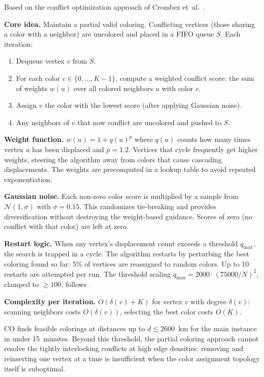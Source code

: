 \documentclass[11pt,a4paper]{article}
\begin{document}
Based on the conflict optimization approach of Crombez et~al.\ \cite{crombez2023}.

\textbf{Core idea.} Maintain a partial valid coloring. Conflicting vertices (those
sharing a color with a neighbor) are uncolored and placed in a FIFO queue $S$. Each
iteration:
\begin{enumerate}
  \item Dequeue vertex $v$ from $S$.
  \item For each color $c \in \{0, \ldots, K-1\}$, compute a weighted conflict score:
        the sum of weights $w(u)$ over all colored neighbors $u$ with color $c$.
  \item Assign $v$ the color with the lowest score (after applying Gaussian noise).
  \item Any neighbors of $v$ that now conflict are uncolored and pushed to $S$.
\end{enumerate}

\textbf{Weight function.} $w(u) = 1 + q(u)^p$ where $q(u)$ counts how many times vertex
$u$ has been displaced and $p = 1.2$. Vertices that cycle frequently get higher weights,
steering the algorithm away from colors that cause cascading displacements. The weights
are precomputed in a lookup table to avoid repeated exponentiation.

\textbf{Gaussian noise.} Each non-zero color score is multiplied by a sample from
$\mathcal{N}(1, \sigma)$ with $\sigma = 0.15$. This randomizes tie-breaking and provides
diversification without destroying the weight-based guidance. Scores of zero (no conflict
with that color) are left at zero.

\textbf{Restart logic.} When any vertex's displacement count exceeds a threshold
$q_{\max}$, the search is trapped in a cycle. The algorithm restarts by perturbing the
best coloring found so far: 5\% of vertices are reassigned to random colors. Up to 10
restarts are attempted per run. The threshold scaling
$q_{\max} = 2000 \cdot (75000 / N)^2$, clamped to $\ge 100$, follows \cite{crombez2023}.

\textbf{Complexity per iteration.} $O(\delta(v) + K)$ for vertex $v$ with degree
$\delta(v)$: scanning neighbors costs $O(\delta(v))$, selecting the best color costs
$O(K)$.

CO finds feasible colorings at distances up to $d \lesssim 2600$~km for the main instance
in under 15~minutes. Beyond this threshold, the partial coloring approach cannot resolve
the tightly interlocking conflicts at high edge densities: removing and reinserting one
vertex at a time is insufficient when the color assignment topology itself is suboptimal.
\end{document}
